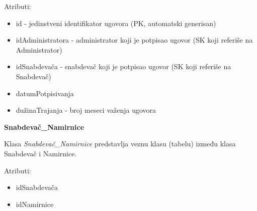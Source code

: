 Atributi:
\begin{itemize}
    \item id - jedinstveni identifikator ugovora (PK, automatski generisan)
    \item idAdministratora - administrator koji je potpisao ugovor (SK koji referiše na Administrator)
    \item idSnabdevača - snabdevač koji je potpisao ugovor (SK koji referiše na Snabdevač)
    \item datumPotpisivanja
    \item dužinaTrajanja - broj meseci važenja ugovora
\end{itemize}

\textbf{\large {Snabdevač\_Namirnice}}
\vspace{0.3cm}

Klasa \textit{Snabdevač\_Namirnice} predstavlja veznu klasu (tabelu) između klasa Snabdevač i Namirnice.

Atributi:
\begin{itemize}
    \item idSnabdevača
    \item idNamirnice
\end{itemize}
